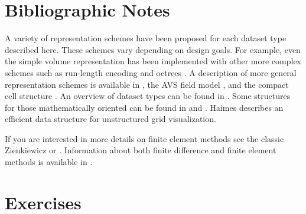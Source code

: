 \section{Bibliographic Notes}

A variety of representation schemes have been proposed for each dataset type described here. These schemes vary depending on design goals. For example, even the simple volume representation has been implemented with other more complex schemes such as run-length encoding and octrees \cite{Bloomenthal88}. A description of more general representation schemes is available in \cite{Haber91}, the AVS field model \cite{AVS89}, and the compact cell structure \cite{Schroeder94}. An overview of dataset types can be found in \cite{Gelberg90}. Some structures for those mathematically oriented can be found in \cite{Brisson90} and \cite{Poluzzi93}. Haimes \cite{VISUAL3} describes an efficient data structure for unstructured grid visualization.

If you are interested in more details on finite element methods see the classic Zienkiewicz \cite{Zienkiewicz87} or \cite{Gallagher75}. Information about both finite difference and finite element methods is available in \cite{Lapidus82}.

\printbibliography


\section{Exercises}

